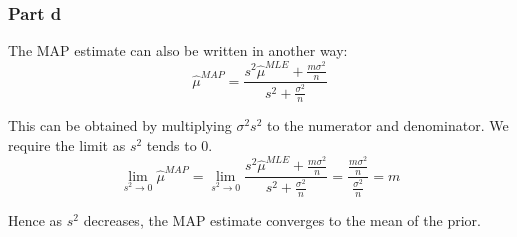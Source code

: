 \documentclass{article}
\begin{document}
\subsubsection*{Part d}
\begin{flushleft}
The MAP estimate can also be written in another way:
\begin{equation}
\hat{\mu}^{MAP} = \frac{s^2\hat{\mu}^{MLE} + \frac{m\sigma^{2}}{n}}{s^{2} + \frac{\sigma^{2}}{n}}
\end{equation}

This can be obtained by multiplying \(\sigma^{2} s^2\) to the numerator and denominator. We require the limit as \(s^{2}\) tends to \(0\).
\begin{equation}
\lim_{s^{2}\to 0} \hat{\mu}^{MAP} = \lim_{s^{2}\to 0} \frac{s^2\hat{\mu}^{MLE} + \frac{m\sigma^{2}}{n}}{s^{2} + \frac{\sigma^{2}}{n}} = \frac{\frac{m\sigma^{2}}{n}}{\frac{\sigma^{2}}{n}} = m
\end{equation}

Hence as \(s^{2}\) decreases, the MAP estimate converges to the mean of the prior.
\end{flushleft}
\end{document}

